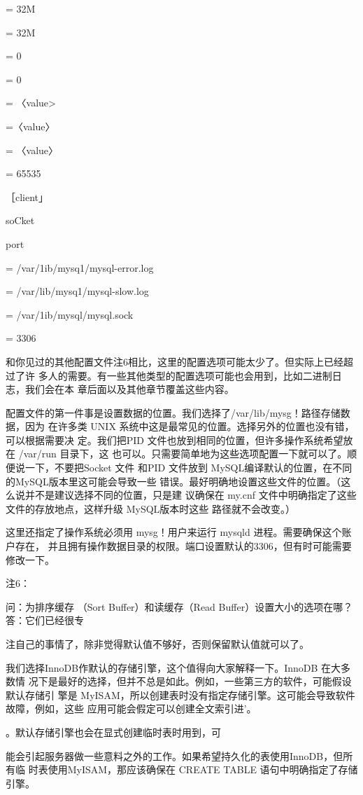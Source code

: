 = 32M

= 32M

= 0

= 0

= 〈value>

=〈value〉

= 〈value〉

= 65535

［client」

soCket

port

= /var/1ib/mysq1/mysql-error.log

= /var/lib/mysq1/mysql-slow.log

= /var/1ib/mysql/mysql.sock

= 3306

和你见过的其他配置文件注6相比，这里的配置选项可能太少了。但实际上已经超过了许
多人的需要。有一些其他类型的配置选项可能也会用到，比如二进制日志，我们会在本
章后面以及其他章节覆盖这些内容。

配置文件的第一件事是设置数据的位置。我们选择了/var/lib/mysg！路径存储数据，因为
在许多类 UNIX 系统中这是最常见的位置。选择另外的位置也没有错，可以根据需要决
定。我们把PID 文件也放到相同的位置，但许多操作系统希望放在 /var/run 目录下，这
也可以。只需要简单地为这些选项配置一下就可以了。顺便说一下，不要把Socket 文件
和PID 文件放到 MySQL编译默认的位置，在不同的MySQL版本里这可能会导致一些
错误。最好明确地设置这些文件的位置。（这么说并不是建议选择不同的位置，只是建
议确保在 my.cnf 文件中明确指定了这些文件的存放地点，这样升级 MySQL版本时这些
路径就不会改变。）

这里还指定了操作系统必须用 mysg！用户来运行 mysqld 进程。需要确保这个账户存在，
并且拥有操作数据目录的权限。端口设置默认的3306，但有时可能需要修改一下。

注6：

问：为排序缓存 （Sort Buffer）和读缓存（Read Buffer）设置大小的选项在哪？答：它们已经很专

注自己的事情了，除非觉得默认值不够好，否则保留默认值就可以了。

我们选择InnoDB作默认的存储引擎，这个值得向大家解释一下。InnoDB 在大多数情
况下是最好的选择，但并不总是如此。例如，一些第三方的软件，可能假设默认存储引
擎是 MyISAM，所以创建表时没有指定存储引擎。这可能会导致软件故障，例如，这些
应用可能会假定可以创建全文索引进’。

。默认存储引擎也会在显式创建临时表时用到，可

能会引起服务器做一些意料之外的工作。如果希望持久化的表使用InnoDB，但所有临
时表使用MyISAM，那应该确保在 CREATE TABLE 语句中明确指定了存储引擎。

